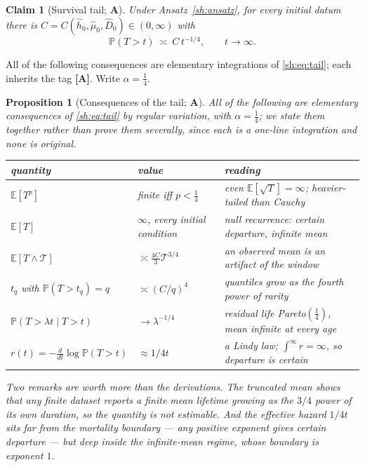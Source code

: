 \documentclass[11pt]{article}
\numberwithin{equation}{section}
\theoremstyle{plain}
\newtheorem{proposition}[theorem]{Proposition}
\newtheorem{claim}[theorem]{Claim}
\theoremstyle{definition}
\theoremstyle{remark}
\newcommand{\E}{\mathbb{E}}
\newcommand{\PP}{\mathbb{P}}
\begin{document}
\begin{claim}[Survival tail; \textbf{A}]\label{sh:claim:tail}
Under Ansatz~\ref{sh:ansatz}, for every initial datum there is
$C=C(\hat h_0,\hat\mu_0,\hat D_0)\in(0,\infty)$ with
\begin{equation}\label{sh:eq:tail}
\PP(T>t)\ \asymp\ C\,t^{-1/4},\qquad t\to\infty .
\end{equation}
\end{claim}

All of the following consequences are elementary integrations of
\eqref{sh:eq:tail}; each inherits the tag \textbf{[A]}. Write
$\alpha=\tfrac14$.

\begin{proposition}[Consequences of the tail; \textbf{A}]
\label{sh:prop:tailconseq}\label{sh:cor:moments}\label{sh:cor:mean}%
\label{sh:cor:trunc}\label{sh:cor:quant}\label{sh:cor:residual}%
\label{sh:cor:lindy}
All of the following are elementary consequences of \eqref{sh:eq:tail}
by regular variation, with $\alpha=\tfrac14$; we state them together
rather than prove them severally, since each is a one-line integration
and none is original.

\begin{center}\small
\begin{tabular}{@{}lll@{}}
\toprule
quantity & value & reading\\
\midrule
$\E[T^{p}]$ & finite iff $p<\tfrac14$ &
even $\E[\sqrt T]=\infty$; heavier-tailed than Cauchy\\
$\E[T]$ & $\infty$, every initial condition &
null recurrence: certain departure, infinite mean\\
$\E[T\wedge\mathcal T]$ & $\asymp\tfrac{4C}{3}\mathcal T^{3/4}$ &
an observed mean is an artifact of the window\\
$t_q$ with $\PP(T>t_q)=q$ & $\asymp(C/q)^{4}$ &
quantiles grow as the fourth power of rarity\\
$\PP(T>\lambda t\mid T>t)$ & $\to\lambda^{-1/4}$ &
residual life Pareto$(\tfrac14)$, mean infinite at every age\\
$r(t)=-\tfrac{d}{dt}\log\PP(T>t)$ & $\approx 1/4t$ &
a Lindy law; $\int^\infty r=\infty$, so departure is certain\\
\bottomrule
\end{tabular}
\end{center}

\noindent Two remarks are worth more than the derivations. The truncated
mean shows that any finite dataset reports a finite mean lifetime
growing as the $3/4$ power of its own duration, so the quantity is not
estimable. And the effective hazard $1/4t$ sits far from the mortality
boundary --- any positive exponent gives certain departure --- but deep
inside the infinite-mean regime, whose boundary is exponent $1$.
\end{proposition}
\end{document}
